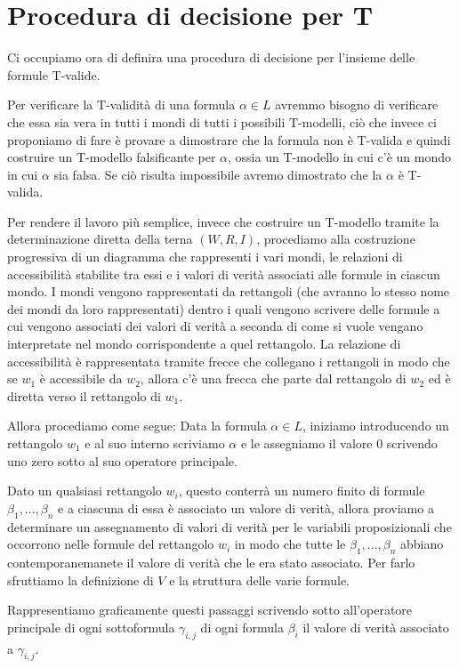 \documentclass[a4paper, titlepage, 12pt]{report}
\begin{document}
\section{Procedura di decisione per T}
Ci occupiamo ora di definira una procedura di decisione per l'insieme delle formule T-valide.

Per verificare la T-validità di una formula $\alpha \in L$ avremmo bisogno di verificare che essa sia vera in tutti
i mondi di tutti i possibili T-modelli, ciò che invece ci proponiamo di fare è
provare a dimostrare che la formula non è T-valida e quindi costruire un T-modello
falsificante per $\alpha$, ossia un T-modello in cui c'è un mondo in cui $\alpha$ sia falsa.
Se ciò risulta impossibile avremo dimostrato che la $\alpha$ è T-valida.

Per rendere il lavoro più semplice, invece che costruire un T-modello
tramite la determinazione diretta della terna $(W, R, I)$, procediamo alla costruzione
progressiva di un diagramma che rappresenti i vari mondi, le relazioni di accessibilità
stabilite tra essi e i valori di verità associati alle formule in ciascun mondo.
I mondi vengono rappresentati da rettangoli (che avranno lo stesso nome dei mondi
da loro rappresentati) dentro i quali
vengono scrivere delle formule a cui vengono associati
dei valori di verità a seconda di come si vuole vengano interpretate nel mondo
corrispondente a quel rettangolo. La relazione di accessibilità è rappresentata
tramite frecce che collegano i rettangoli in modo che se $w_1$ è accessibile da $w_2$,
allora c'è una frecca che parte dal rettangolo di $w_2$ ed è diretta verso il rettangolo
di $w_1$.


Allora procediamo come segue:
Data la formula $\alpha \in L$, iniziamo introducendo un rettangolo $w_1$ e
al suo interno scriviamo $\alpha$ e le assegniamo il valore $0$ scrivendo uno zero
sotto al suo operatore principale.

Dato un qualsiasi rettangolo $w_i$, questo conterrà un numero finito di formule
$\beta_1, ..., \beta_n$
e a ciascuna di essa è associato un valore di verità, allora proviamo
a determinare un assegnamento di valori di verità per le variabili proposizionali
che occorrono nelle formule del rettangolo $w_i$
in modo che tutte le $\beta_1, ..., \beta_n$
abbiano contemporanemanete il valore di verità che le era stato associato.
Per farlo sfruttiamo la definizione di $V$ e la struttura delle varie formule.

Rappresentiamo graficamente questi passaggi scrivendo sotto all'operatore principale
di ogni sottoformula $\gamma_{i,j}$ di ogni formula $\beta_i$
il valore di verità associato a $\gamma_{i,j}$.
\end{document}
